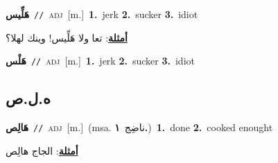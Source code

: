 \documentclass[10pt,a4paper,twoside]{article} %
\begin{document}
\begin{multicols}{2}
{\setlength\topsep{0pt}\textbf{\foreignlanguage{arabic}{هَلِّيس}}\ {\color{gray}\texttt{//}\color{black}}\ \textsc{adj}\ [m.]\ \textbf{1.}~jerk  \textbf{2.}~sucker  \textbf{3.}~idiot\  \begin{flushright}\color{gray}\foreignlanguage{arabic}{\textbf{\underline{\foreignlanguage{arabic}{أمثلة}}}: تعا ولا هَلِّيس! وينك لهلا؟}\end{flushright}\color{black}} \vspace{2mm}

{\setlength\topsep{0pt}\textbf{\foreignlanguage{arabic}{هَلْس}}\ {\color{gray}\texttt{//}\color{black}}\ \textsc{adj}\ [m.]\ \textbf{1.}~jerk  \textbf{2.}~sucker  \textbf{3.}~idiot\ } \vspace{2mm}

\vspace{-3mm}
\subsection*{\color{blue}\foreignlanguage{arabic}{ه.ل.ص}\color{blue}{}} 

{\setlength\topsep{0pt}\textbf{\foreignlanguage{arabic}{هَالِص}}\ {\color{gray}\texttt{//}\color{black}}\ \textsc{adj}\ [m.]\ \color{gray}(msa. \foreignlanguage{arabic}{ناضِج}~\foreignlanguage{arabic}{\textbf{١.}})\color{black}\ \textbf{1.}~done  \textbf{2.}~cooked enought\  \begin{flushright}\color{gray}\foreignlanguage{arabic}{\textbf{\underline{\foreignlanguage{arabic}{أمثلة}}}: الجاج هالِص}\end{flushright}\color{black}} \vspace{2mm}


\end{multicols}
\end{document}

